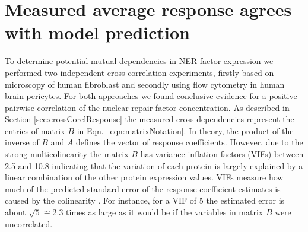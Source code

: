 \section{Measured average response agrees with model prediction}
To determine potential mutual dependencies in NER factor expression we performed two independent cross-correlation experiments, firstly based on microscopy of human fibroblast and secondly using flow cytometry in human brain pericytes. For both approaches we found conclusive evidence for a positive pairwise correlation of the nuclear repair factor concentration. As described in Section \ref{sec:crossCorelResponse} the measured cross-dependencies represent the entries of matrix $B$ in Eqn.\ \ref{eqn:matrixNotation}. In theory, the product of the inverse of $B$ and $A$ defines the vector of response coefficients. However, due to the strong multicolinearity the matrix $B$ has variance inflation factors (VIFs)\label{sec:vif} between 2.5 and 10.8 indicating that the variation of each protein is largely explained by a linear combination of the other protein expression values. VIFs measure how much of the predicted standard error of the response coefficient estimates is caused by the colinearity \cite{allison1999multiple}. For instance, for a VIF of 5 the estimated error is  about $\sqrt{5} \cong 2.3$ times as large as it would be if the variables in matrix $B$ were uncorrelated. 
